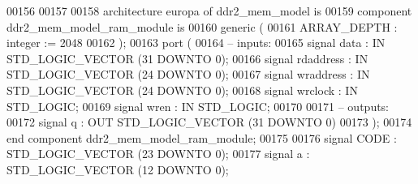\begin{DoxyCode}
00156 
00157 
00158 \textcolor{keywordflow}{architecture} europa \textcolor{keywordflow}{of} ddr2_mem_model is
00159 \textcolor{keywordflow}{component} ddr2_mem_model_ram_module \textcolor{keywordflow}{is} 
00160            \textcolor{keywordflow}{generic} (
00161                     ARRAY_DEPTH : \textcolor{comment}{integer} := \textcolor{vhdllogic}{}\textcolor{vhdllogic}{2048}
00162                     );
00163            \textcolor{keywordflow}{port} (
00164 \textcolor{keyword}{                 -- inputs:}
00165                     \textcolor{keywordflow}{signal} data : \textcolor{keywordflow}{IN} \textcolor{comment}{STD\_LOGIC\_VECTOR} (\textcolor{vhdllogic}{}\textcolor{vhdllogic}{31} \textcolor{keywordflow}{DOWNTO} \textcolor{vhdllogic}{}\textcolor{vhdllogic}{0});
00166                     \textcolor{keywordflow}{signal} rdaddress : \textcolor{keywordflow}{IN} \textcolor{comment}{STD\_LOGIC\_VECTOR} (\textcolor{vhdllogic}{}\textcolor{vhdllogic}{24} \textcolor{keywordflow}{DOWNTO} \textcolor{vhdllogic}{}\textcolor{vhdllogic}{0});
00167                     \textcolor{keywordflow}{signal} wraddress : \textcolor{keywordflow}{IN} \textcolor{comment}{STD\_LOGIC\_VECTOR} (\textcolor{vhdllogic}{}\textcolor{vhdllogic}{24} \textcolor{keywordflow}{DOWNTO} \textcolor{vhdllogic}{}\textcolor{vhdllogic}{0});
00168                     \textcolor{keywordflow}{signal} wrclock : \textcolor{keywordflow}{IN} \textcolor{comment}{STD\_LOGIC};
00169                     \textcolor{keywordflow}{signal} wren : \textcolor{keywordflow}{IN} \textcolor{comment}{STD\_LOGIC};
00170 
00171 \textcolor{keyword}{                 -- outputs:}
00172                     \textcolor{keywordflow}{signal} q : \textcolor{keywordflow}{OUT} \textcolor{comment}{STD\_LOGIC\_VECTOR} (\textcolor{vhdllogic}{}\textcolor{vhdllogic}{31} \textcolor{keywordflow}{DOWNTO} \textcolor{vhdllogic}{}\textcolor{vhdllogic}{0})
00173                  );
00174 \textcolor{keywordflow}{end} \textcolor{keywordflow}{component} \textcolor{vhdlchar}{ddr2_mem_model_ram_module};
00175 
00176                 \textcolor{keywordflow}{signal} \textcolor{vhdlchar}{CODE} \textcolor{vhdlchar}{:}  \textcolor{comment}{STD\_LOGIC\_VECTOR} \textcolor{vhdlchar}{(}\textcolor{vhdllogic}{}\textcolor{vhdllogic}{23} \textcolor{keywordflow}{DOWNTO} \textcolor{vhdllogic}{}\textcolor{vhdllogic}{0}\textcolor{vhdlchar}{)};
00177                 \textcolor{keywordflow}{signal} \textcolor{vhdlchar}{a} \textcolor{vhdlchar}{:}  \textcolor{comment}{STD\_LOGIC\_VECTOR} \textcolor{vhdlchar}{(}\textcolor{vhdllogic}{}\textcolor{vhdllogic}{12} \textcolor{keywordflow}{DOWNTO} \textcolor{vhdllogic}{}\textcolor{vhdllogic}{0}\textcolor{vhdlchar}{)};

\end{DoxyCode}
